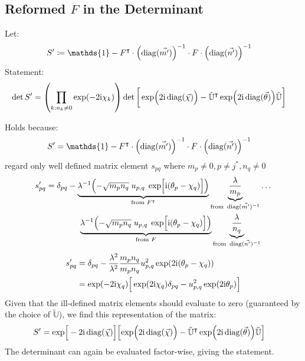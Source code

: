 \documentclass[
	english,
	a4paper,
	fontsize=10pt,
	parskip=half,
	titlepage=true,
	DIV=12,
	final
]{scrreprt}
\newcommand*{\transp}{\ensuremath{^\intercal}}
\newcommand*{\iunit}{\ensuremath{\mathrm{i}}}
\DeclareMathOperator{\diag}{diag}
\begin{document}
\subsection{Reformed $F$ in the Determinant}
Let:
\begin{align}
	S'
&\coloneqq
	\mathds{1} -
	F\transp \cdot 
	\qty( \diag(\vec{m'}) )^{-1} \cdot
	F \cdot \qty( \diag(\vec{n'}) )^{-1}
\end{align}
Statement:
\begin{align}
	\det S'
&=
	\qty( \prod_{k: n_k \neq 0} \exp(-2\iunit \chi_k) )
	\det\qty[\bigg.
		\exp(\Big. 
			2\iunit 
			\diag(\vec{\chi})
		)
		-
		\tilde{\mathbb{U}}\transp
		\exp(
			2\iunit 
			\diag(\vec{\theta})
		)
		\tilde{\mathbb{U}}
	]
\end{align}

Holds because:
\begin{align}
	S'
&=
	\mathds{1} -
	F\transp \cdot 
	\qty( \diag(\vec{m'}) )^{-1} \cdot
	F \cdot \qty( \diag(\vec{n'}) )^{-1}
\end{align}
regard only well defined matrix element $s_{pq}$ where $m_p \neq 0, p \neq j^*, n_q \neq 0$
\begin{align}
	s'_{pq}
&=
	\nonumber
	\delta_{pq} -
	\underbrace{
		\lambda^{-1}
		\qty( -\sqrt{m_p n_q} \; u_{p,q} \; \exp[\Big. \iunit(\theta_p - \chi_q)] )
	}_{\text{from } F\transp}
	\underbrace{
		\frac{\lambda}{m_p}
	}_{\text{from } \diag(\vec{m'})^{-1}}
	\ldots
	\\ 
	& \qquad\qquad
	\underbrace{
		\lambda^{-1}
		\qty( -\sqrt{m_p n_q} \; u_{p,q} \; \exp[\Big. \iunit(\theta_p - \chi_q)] )
	}_{\text{from } F}
	\underbrace{
		\frac{\lambda}{n_q}
	}_{\text{from } \diag(\vec{n'})^{-1}} \\
\end{align}
\begin{align}
	s'_{pq}
&=
	\delta_{pq} -
	\frac{\lambda^2}{\lambda^2}
	\frac{m_p n_q}{m_p n_q}
	u_{p,q}^{2}
	\exp(2\iunit(\theta_p - \chi_q)) \\
&=
	\exp(-2\iunit\chi_q) \qty[ \Big.
		\exp(2\iunit\chi_q)\delta_{pq}
		-
		u_{p,q}^{2}
		\exp(2\iunit \theta_p)
	]
\end{align}
Given that the ill-defined matrix elements should evaluate to zero (guaranteed by the choice of $\tilde{\mathbb{U}}$), we find this representation of the matrix:
\begin{align*}
	S'
&=
	\exp[\Big. -2\iunit\diag(\vec{\chi})]
	\qty[
		\exp(\Big. 2\iunit\diag(\vec{\chi}))
		-
		\tilde{\mathbb{U}}\transp
		\exp(\Big. 2\iunit\diag(\vec{\theta}))
		\tilde{\mathbb{U}}
	]
\end{align*}
The determinant can again be evaluated factor-wise, giving the statement.
\end{document}
